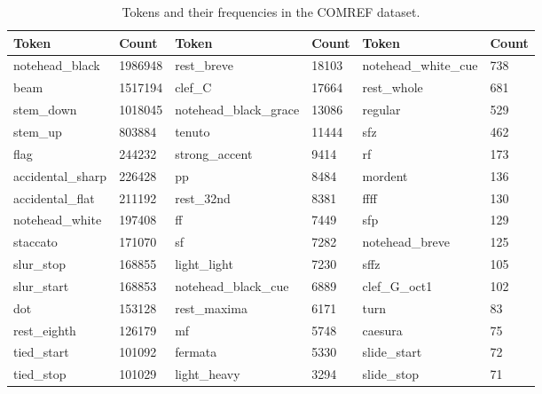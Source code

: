 \begin{table*}[ht]
\caption{Tokens and their frequencies in the COMREF dataset.}
\label{tab:tokens}
\centering
\begin{tabular}{@{}llllll@{}}
\toprule
Token               & Count   & Token                     & Count & Token                       & Count   \\ \midrule
notehead\_black     & 1986948 & rest\_breve               & 18103 & notehead\_white\_cue        & 738     \\
beam                & 1517194 & clef\_C                   & 17664 & rest\_whole                 & 681     \\
stem\_down          & 1018045 & notehead\_black\_grace    & 13086 & regular                     & 529     \\
stem\_up            & 803884  & tenuto                    & 11444 & sfz                         & 462     \\
flag                & 244232  & strong\_accent            & 9414  & rf                          & 173     \\
accidental\_sharp   & 226428  & pp                        & 8484  & mordent                     & 136     \\
accidental\_flat    & 211192  & rest\_32nd                & 8381  & ffff                        & 130     \\
notehead\_white     & 197408  & ff                        & 7449  & sfp                         & 129     \\
staccato            & 171070  & sf                        & 7282  & notehead\_breve             & 125     \\
slur\_stop          & 168855  & light\_light              & 7230  & sffz                        & 105     \\
slur\_start         & 168853  & notehead\_black\_cue      & 6889  & clef\_G\_oct1               & 102     \\
dot                 & 153128  & rest\_maxima              & 6171  & turn                        & 83      \\
rest\_eighth        & 126179  & mf                        & 5748  & caesura                     & 75      \\
tied\_start         & 101092  & fermata                   & 5330  & slide\_start                & 72      \\
tied\_stop          & 101029  & light\_heavy              & 3294  & slide\_stop                 & 71      \\

\end{tabular}
\end{table*}
